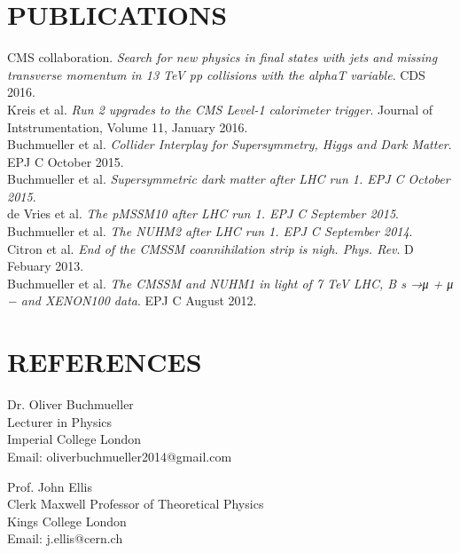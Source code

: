 \documentclass[9pt]{res} %
\begin{document}
\begin{resume}
\section{PUBLICATIONS}
CMS collaboration. \textit{Search for new physics in final states with jets and missing transverse momentum in 13 TeV pp collisions with the alphaT variable}. CDS 2016.\\
Kreis et al. \textit{Run 2 upgrades to the CMS Level-1 calorimeter trigger}. Journal of Intstrumentation, Volume 11, January 2016.\\
Buchmueller et al. \textit{Collider Interplay for Supersymmetry, Higgs and Dark Matter}. EPJ C October 2015.\\
Buchmueller et al. \textit{Supersymmetric dark matter after LHC run 1. EPJ C October 2015}.\\
de Vries et al. \textit{The pMSSM10 after LHC run 1. EPJ C September 2015}.\\
Buchmueller et al. \textit{The NUHM2 after LHC run 1. EPJ C September 2014}.\\
Citron et al. \textit{End of the CMSSM coannihilation strip is nigh. Phys. Rev}. D Febuary 2013.\\
Buchmueller et al. \textit{The CMSSM and NUHM1 in light of 7 TeV LHC, B s →μ + μ − and XENON100 data}. EPJ C August 2012.





\section{REFERENCES}
\vspace{0.2cm}
\begin{minipage}[t]{0.5\textwidth}
Dr. Oliver Buchmueller\\
Lecturer in Physics\\
Imperial College London\\
Email: oliverbuchmueller2014@gmail.com
\end{minipage}
\begin{minipage}[t]{0.5\textwidth}
Prof. John Ellis\\
Clerk Maxwell Professor of Theoretical Physics\\
Kings College London\\
Email: j.ellis@cern.ch
\end{minipage}

\end{resume}
\end{document}
